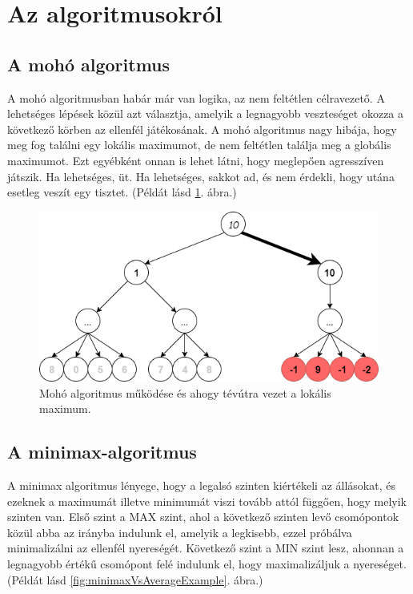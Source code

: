 \documentclass[twoside, a4paper, 12pt]{article}
\begin{document}
\section{Az algoritmusokról}

\subsection{A mohó algoritmus}
A mohó algoritmusban habár már van logika, az nem feltétlen célravezető. A lehetséges lépések közül azt választja, amelyik a legnagyobb veszteséget okozza a következő körben az ellenfél játékosának. A mohó algoritmus nagy hibája, hogy meg fog találni egy lokális maximumot, de nem feltétlen találja meg a globális maximumot. Ezt egyébként onnan is lehet látni, hogy meglepően agresszíven játszik. Ha lehetséges, üt. Ha lehetséges, sakkot ad, és nem érdekli, hogy utána esetleg veszít egy tisztet.
(Példát lásd \ref{fig:greedyAlgorithmExampleDangerous}. ábra.)
\begin{figure}[htbp]
	\centering
	\includegraphics[width=\textwidth]{img/greedyAlgorithmExampleDangerous.png}
	\caption{Mohó algoritmus működése és ahogy tévútra vezet a lokális maximum.}
	\label{fig:greedyAlgorithmExampleDangerous}
\end{figure}

\subsection{A minimax-algoritmus}
A minimax algoritmus lényege, hogy a legalsó szinten kiértékeli az állásokat, és ezeknek a maximumát illetve minimumát viszi tovább attól függően, hogy melyik szinten van. Első szint a MAX szint, ahol a következő szinten levő csomópontok közül abba az irányba indulunk el, amelyik a legkisebb, ezzel próbálva minimalizálni az ellenfél nyereségét. Következő szint a MIN szint lesz, ahonnan a legnagyobb értékű csomópont felé indulunk el, hogy maximalizáljuk a nyereséget. (Példát lásd \ref{fig:minimaxVsAverageExample}. ábra.)\cite{bevMiHu}
\end{document}
